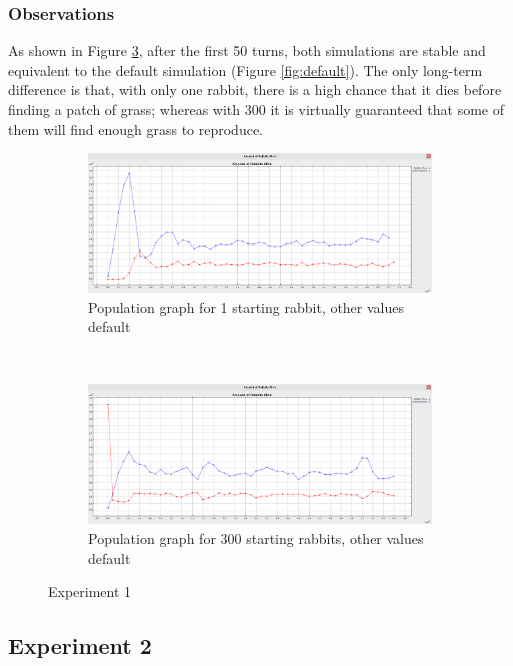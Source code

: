 \documentclass[11pt]{article}
\begin{document}
\subsubsection{Observations}

As shown in Figure \ref{fig:exp-1}, after the first 50 turns, both simulations are stable and equivalent to the default simulation (Figure \ref{fig:default}). The only long-term difference is that, with only one rabbit, there is a high chance that it dies before finding a patch of grass; whereas with 300 it is virtually guaranteed that some of them will find enough grass to reproduce.

\begin{figure}[h]
    \centering
    \begin{subfigure}[H]{\textwidth}
        \includegraphics[width = \textwidth]{1-rabbit-default}
        \caption{Population graph for 1 starting rabbit, other values default}
        \label{fig:1-rabbit}
    \end{subfigure}
    ~
    \begin{subfigure}[H]{\textwidth}
        \includegraphics[width = \textwidth]{300-rabbits-default}
        \caption{Population graph for 300 starting rabbits, other values default}
        \label{fig:300-rabbits}
    \end{subfigure}
    \caption{Experiment 1}\label{fig:exp-1}
\end{figure}

\subsection{Experiment 2}
\end{document}
